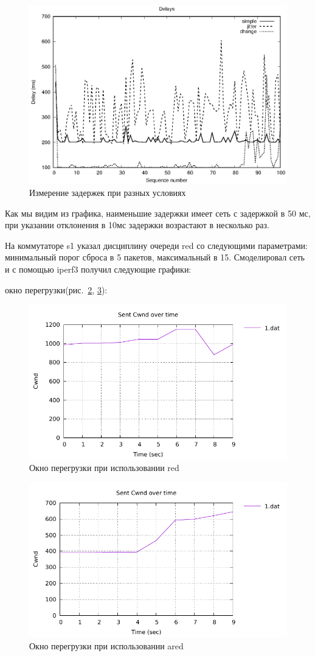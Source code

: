 \begin{figure}[!ht]
  \centering
  \includegraphics[width=0.6\linewidth]{image/pings.eps}
  \caption{Измерение задержек при разных условиях}
  \label{fig:3.8}
\end{figure}

Как мы видим из графика, наименьшие задержки имеет сеть с задержкой в 50 мс, при указании отклонения в 10мс задержки возрастают в несколько раз.


На коммутаторе s1 указал дисциплину очереди red со следующими параметрами: минимальный порог сброса в 5 пакетов, максимальный в 15.
Смоделировал сеть и с помощью iperf3 получил следующие графики: 


окно перегрузки(рис.~\ref{fig:3.9}, \ref{fig:3.10}):

\begin{figure}[!ht]
  \centering
  \includegraphics[width=0.6\linewidth]{image/mininet_red/cwnd.pdf}
  \caption{Окно перегрузки при использовании red}
  \label{fig:3.9}
\end{figure}

\begin{figure}[!ht]
  \centering
  \includegraphics[width=0.6\linewidth]{image/mininet_ared/cwnd.pdf}
  \caption{Окно перегрузки при использовании ared}
  \label{fig:3.10}
\end{figure}

